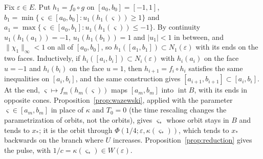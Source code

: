 \documentclass[11pt]{article}
\theoremstyle{definition}
\newcommand{\eps}{\varepsilon}
\newcommand{\xs}{x_*}
\begin{document}
Fix $\eps \in E$. Put $h_1 = f_0 \circ g$ on $[a_0, b_0] = [-1, 1]$, $b_1 = \min\{\varsigma \in [a_0, b_0] : u_1(h_1(\varsigma)) \ge 1\}$ and $a_1 = \max\{\varsigma \in [a_0, b_1] : u_1(h_1(\varsigma)) \le -1\}$. By continuity $u_1(h_1(a_1)) = -1$, $u_1(h_1(b_1)) = 1$ and $|u_1| < 1$ in between, and $\|\chi_1\|_\infty < 1$ on all of $[a_0, b_0]$, so $h_1([a_1, b_1]) \subset N_1(\eps)$ with its ends on the two faces. Inductively, if $h_i([a_i, b_i]) \subset N_i(\eps)$ with $h_i(a_i)$ on the face $u = -1$ and $h_i(b_i)$ on the face $u = 1$, then $h_{i+1} = f_i \circ h_i$ satisfies the same inequalities on $[a_i, b_i]$, and the same construction gives $[a_{i+1}, b_{i+1}] \subset [a_i, b_i]$. At the end, $\varsigma \mapsto f_m(h_m(\varsigma))$ maps $[a_m, b_m]$ into $\operatorname{int} B$, with its ends in opposite cones. Proposition~\ref{prop:wazewski}, applied with the parameter $\varsigma \in [a_m, b_m]$ in place of $\kappa$ and $T_0 = 0$ (the time rescaling changes the parametrization of orbits, not the orbits), gives $\varsigma_*$ whose orbit stays in $B$ and tends to $\xs$; it is the orbit through $\Phi(1/4; \eps, \kappa(\varsigma_*))$, which tends to $\xs$ backwards on the branch where $U$ increases. Proposition~\ref{prop:reduction} gives the pulse, with $1/c = \kappa(\varsigma_*) \in W(\eps)$.
\end{document}
